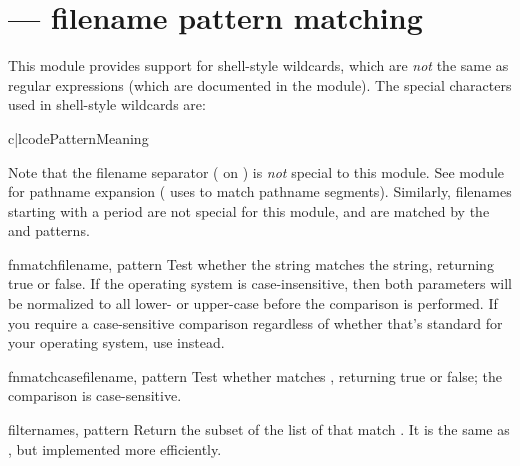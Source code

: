 \section{ ---
         \UNIX{} filename pattern matching}




This module provides support for \UNIX{} shell-style wildcards, which
are \emph{not} the same as regular expressions (which are documented
in the  module).  The special
characters used in shell-style wildcards are:

\begin{tableii}{c|l}{code}{Pattern}{Meaning}
\end{tableii}

Note that the filename separator ( on \UNIX) is \emph{not}
special to this module.  See module
 for pathname expansion
( uses  to match pathname
segments).  Similarly, filenames starting with a period are
not special for this module, and are matched by the \code{*} and
 patterns.


\begin{funcdesc}{fnmatch}{filename, pattern}
Test whether the  string matches the 
string, returning true or false.  If the operating system is
case-insensitive, then both parameters will be normalized to all
lower- or upper-case before the comparison is performed.  If you
require a case-sensitive comparison regardless of whether that's
standard for your operating system, use 
instead.
\end{funcdesc}

\begin{funcdesc}{fnmatchcase}{filename, pattern}
Test whether  matches , returning true or
false; the comparison is case-sensitive.
\end{funcdesc}

\begin{funcdesc}{filter}{names, pattern}
Return the subset of the list of  that match .
It is the same as , but
implemented more efficiently.
\end{funcdesc}

\begin{seealso}
\end{seealso}
